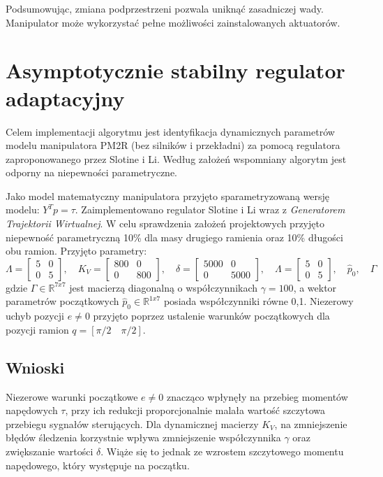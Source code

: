 \documentclass[12pt, a4paper, polish]{article}
\begin{document}
Podsumowując, zmiana podprzestrzeni pozwala uniknąć zasadniczej wady. Manipulator może wykorzystać pełne możliwości zainstalowanych aktuatorów.

\section{Asymptotycznie stabilny regulator adaptacyjny}
Celem implementacji algorytmu jest identyfikacja dynamicznych parametrów modelu manipulatora PM2R (bez silników i przekładni) za pomocą regulatora zaproponowanego przez Slotine i Li. Według założeń wspomniany algorytm jest odporny na niepewności parametryczne.

Jako model matematyczny manipulatora przyjęto sparametryzowaną wersję modelu: $Y^Tp=\tau$. Zaimplementowano regulator Slotine i Li wraz z \textit{Generatorem Trajektorii Wirtualnej}. W celu sprawdzenia założeń projektowych przyjęto niepewność parametryczną 10\% dla masy drugiego ramienia oraz 10\% długości obu ramion. Przyjęto parametry:\begin{equation}
\Lambda=\begin{bmatrix}5 & 0 \\ 0 & 5\end{bmatrix},\quad K_V=\begin{bmatrix}800 & 0 \\ 0 & 800\end{bmatrix}, \quad \delta=\begin{bmatrix}5000 & 0 \\ 0 & 5000\end{bmatrix},\quad \Lambda=\begin{bmatrix}5 & 0 \\ 0 & 5\end{bmatrix},\quad \hat{p}_0,\quad\Gamma\end{equation}
gdzie $\Gamma \in \mathbb{R}^{7x7}$ jest macierzą diagonalną o współczynnikach $\gamma=100$, a wektor parametrów początkowych $\hat{p}_0\in\mathbb{R}^{1x7}$ posiada współczynniki równe 0,1. Niezerowy uchyb pozycji $e\neq0$ przyjęto poprzez ustalenie warunków początkowych dla pozycji ramion $q=[\pi/2\quad \pi/2]$. 

\subsection{Wnioski}
Niezerowe warunki początkowe $e\neq0$ znacząco wpłynęły na przebieg momentów napędowych $\tau$, przy ich redukcji proporcjonalnie malała wartość szczytowa przebiegu sygnałów sterujących. 
Dla dynamicznej macierzy $K_V$, na zmniejszenie błędów śledzenia korzystnie wpływa zmniejszenie współczynnika $\gamma$ oraz zwiększanie wartości $\delta$. Wiąże się to jednak ze wzrostem szczytowego momentu napędowego, który występuje na początku.
\end{document}
